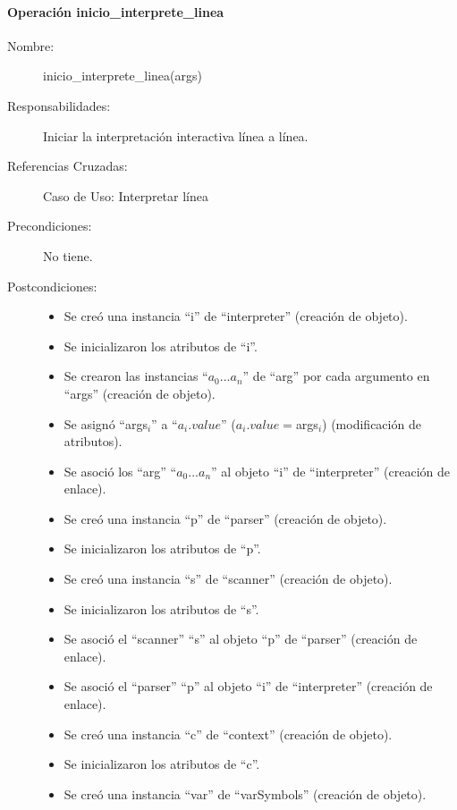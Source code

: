 \paragraph{Operación inicio\_interprete\_linea}
\FloatBarrier
\begin{framed}
	\begin{description}
		\item [Nombre:] inicio\_interprete\_linea(args)
		\item [Responsabilidades:] Iniciar la interpretación interactiva línea a línea.
		\item [Referencias Cruzadas: ] Caso de Uso: Interpretar línea
      \item [Precondiciones:] No tiene.
      \item [Postcondiciones:] \hfill
      \begin {itemize}
         \item Se creó una instancia ``i'' de ``interpreter'' (creación de objeto).
         \item Se inicializaron los atributos de ``i''.
         \item Se crearon las instancias ``$a_0...a_n$'' de ``arg'' por cada argumento en ``args'' (creación de objeto).
         \item Se asignó ``args$_i$'' a ``$a_i.value$'' ($a_i.value = $args$_i$) (modificación de atributos).
         \item Se asoció los ``arg'' ``$a_0...a_n$'' al objeto ``i'' de ``interpreter'' (creación de enlace).
         \item Se creó una instancia ``p'' de ``parser'' (creación de objeto).
         \item Se inicializaron los atributos de ``p''.
         \item Se creó una instancia ``s'' de ``scanner'' (creación de objeto).
         \item Se inicializaron los atributos de ``s''.
         \item Se asoció el ``scanner'' ``s'' al objeto ``p'' de ``parser'' (creación de enlace).
         \item Se asoció el ``parser'' ``p'' al objeto ``i'' de ``interpreter'' (creación de enlace).
         \item Se creó una instancia ``c'' de ``context'' (creación de objeto).
         \item Se inicializaron los atributos de ``c''.
         \item Se creó una instancia ``var'' de ``varSymbols'' (creación de objeto).

\end{itemize}
\end{description}
\end{framed}
